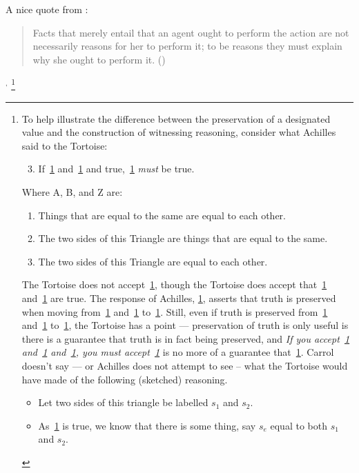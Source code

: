 \documentclass[10pt]{article}
\begin{document}
\begin{note}
{    A nice quote from \textcite{Broome:2013aa}:
    \begin{quote}
      Facts that merely entail that an agent ought to perform the action are not necessarily reasons for her to perform it; to be reasons they must explain why she ought to perform it.\nolinebreak
      \mbox{}\hfill\mbox{(\citeyear[51]{Broome:2013aa})}
    \end{quote}
  }\(^{,}\)
  \footnote{
  To help illustrate the difference between the preservation of a designated value and the construction of witnessing reasoning, consider what Achilles said to the Tortoise:
  \begin{enumerate}[label=(\emph{\Alph*}), ref=\emph{\Alph*}]
     \setcounter{enumi}{2}
    \item\label{achilles:C} If~\ref{achilles:A} and~\ref{achilles:B} and true,~\ref{achilles:C} \emph{must} be true.
  \end{enumerate}
  Where A, B, and Z are:
  \begin{enumerate}[label=(\emph{\Alph*}), ref=\emph{\Alph*}]
  \item\label{achilles:A} Things that are equal to the same are equal to each other.
  \item\label{achilles:B} The two sides of this Triangle are things that are equal to the same.
    \setcounter{enumi}{25}
  \item\label{achilles:Z} The two sides of this Triangle are equal to each other.
  \end{enumerate}
  The Tortoise does not accept~\ref{achilles:C}, though the Tortoise does accept that~\ref{achilles:A} and~\ref{achilles:B} are true.
  The response of Achilles, \ref{achilles:C}, asserts that truth is preserved when moving from~\ref{achilles:A} and~\ref{achilles:B} to~\ref{achilles:Z}.
  Still, even if truth is preserved from~\ref{achilles:A} and~\ref{achilles:B} to~\ref{achilles:Z}, the Tortoise has a point --- preservation of truth is only useful is there is a guarantee that truth is in fact being preserved, and \emph{If you accept~\ref{achilles:A} and~\ref{achilles:B} and~\ref{achilles:C}, you must accept~\ref{achilles:Z}} is no more of a guarantee that~\ref{achilles:Z}.
  Carrol doesn't say --- or Achilles does not attempt to see -- what the Tortoise would have made of the following (sketched) reasoning.
  \begin{itemize}
  \item Let two sides of this triangle be labelled \(s_{1}\) and \(s_{2}\).
  \item As~\ref{achilles:B} is true, we know that there is some thing, say \(s_{e}\) equal to both \(s_{1}\) and \(s_{2}\).

\end{itemize}}
\end{note}
\end{document}
